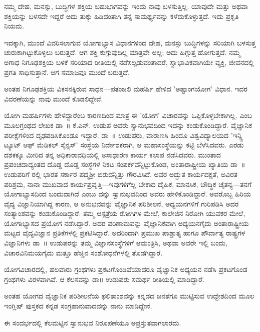 ನಮ್ಮ ದೇಹ, ಮನಸ್ಸು, ಬುದ್ಧಿಗಳ ಶಕ್ತಿಯ ಬಹುಭಾಗವನ್ನು ಇಂದು ನಾವು ಬಳಸುತ್ತಿಲ್ಲ. ಯಾವುದೇ ಮತ್ತು ಅಥವಾ ಶಕ್ತಿಯನ್ನು ಬಳಸದೇ ಇದ್ದರೆ ಅದು ತುಕ್ಕು ಹಿಡಿದಂತಾಗಿ ತನ್ನ ಸಾಮರ್ಥ್ಯವನ್ನು ಕಳೆದುಕೊಳ್ಳುತ್ತದೆ. ಇದು ಪ್ರಕೃತಿ ನಿಯಮ.

ಇದಕ್ಕಾಗಿ, ಮುಂದೆ ವಿವರಿಸಲಾಗುವ ಯೋಗಾಭ್ಯಾಸ ವಿಧಾನಗಳಿಂದ ದೇಹ, ಮನಸ್ಸು ಬುದ್ಧಿಗಳನ್ನು ಸರಿಯಾಗಿ ಬಳಸುತ್ತ ಚುರುಕಾಗಿಟ್ಟುಕೊಳ್ಳಲು ಬರುತ್ತದೆ. ಆಗ ಶಕ್ತಿ ಕುಗ್ಗುವುದಿಲ್ಲ ಮಾತ್ರವೇ ಅಲ್ಲ; ಅದು ಹಿಗ್ಗುತ್ತ ಹೋಗುತ್ತದೆ. ನಮ್ಮ ಅಗಾಧ ನಿಗೂಢಶಕ್ತಿಯ ಬಳಕೆ ಸರಿಯಾದ ರೀತಿಯಲ್ಲಿ ನಡೆಸಲ್ಪಡುವಂತಾದರೆ, ಸ್ವಾಭಾವಿಕವಾಗಿಯೇ ವ್ಯಕ್ತಿ, ಜೀವನದಲ್ಲಿ ಪ್ರಗತಿ ಸಾಧಿಸುತ್ತಾನೆ. ಆಗ ಸಮಾಜವೂ ಮುಂದೆ ಬರುತ್ತದೆ.

ಅಂತಹ ನಿಗೂಢಶಕ್ತಿಯ ವಿಕಸನಕ್ಕಿರುವ ಸಾಧನ—ಪತಂಜಲಿ ಮಹರ್ಷಿ ಹೇಳಿದ 'ಅಷ್ಟಾಂಗಯೋಗ' ವಿಧಾನ. ಇದರ ವಿವರಣೆಯನ್ನು ನಾವು ಮುಂದೆ ಕೊಡಲಿದ್ದೇವೆ.

ಯೋಗಿ ಮಹರ್ಷಿಗಳು ಹೇಳಿದ್ದಾರೆಂಬ ಕಾರಣದಿಂದ ಮಾತ್ರ ಈ 'ಯೋಗ' ವಿಚಾರವನ್ನು ಒಪ್ಪಿಕೊಳ್ಳಬೇಕಾಗಿಲ್ಲ.  ಎಂಬ ಮೂಲಗ್ರಂಥದ ಲೇಖಕ ಡಾ~॥ ಕೆ.ಎನ್. ಉಡುಪ ಅವರು ಸ್ವಾನುಭವದಿಂದ ಇದನ್ನು ಕಂಡುಕೊಂಡಿದ್ದಾರೆ. ವೈಜ್ಞಾನಿಕ ಪರೀಕ್ಷೆಗಳಿಂದ ದೃಢಪಡಿಸಿಕೊಂಡೂ ಇದ್ದಾರೆ. ಡಾ~॥ ಉಡುಪರು, ವಾರಾಣಸಿ ಹಿಂದೂ ವಿಶ್ವವಿದ್ಯಾಲಯದ 'ಇನ್ಸ್ಟಿ ಟ್ಯೂಟ್ ಆಫ್ ಮೆಡಿಕಲ್ ಸೈನ್ಸಸ್​' ಸಂಸ್ಥೆಯ ನಿರ್ದೇಶಕರಾಗಿ, ಆ ಮಹಾಸಂಸ್ಥೆಯನ್ನು ಕಟ್ಟಿ ಬೆಳೆಸಿದವರು. ಎರಡು ದಶಕಕ್ಕೂ ಮೀರಿದ ತನ್ನ ಅಧಿಕಾರಾವಧಿಯಲ್ಲಿ ಅಸಾಧಾರಣ ಕಾರ್ಯ ಕಲಾಪ ನಡೆಸಿದವರು.  ಮುಂತಾದ ಪ್ರಪಂಚದಾದ್ಯಂತದ ದೊಡ್ಡ ದೊಡ್ಡ ಸಂಸ್ಥೆಗಳ ನಿಕಟ ಸಂಪರ್ಕವನ್ನಿಟ್ಟುಕೊಂಡ, ಅಂತಾರಾಷ್ಟ್ರೀಯ ಖ್ಯಾತಿಯ ಡಾ~॥ ಉಡುಪರಿಗೆ  ರಲ್ಲಿ ಭಾರತ ಸರ್ಕಾರ ಪದ್ಮಶ‍್ರೀ ಬಿರುದನ್ನಿತ್ತು ಗೌರವಿಸಿದೆ. ಅವರ ಅದ್ಭುತ ಕಾರ್ಯದಕ್ಷತೆ, ಅವಿರತ ಪರಿಶ್ರಮ, ನಾನಾ ಮುಖವಾದ ಕಾರ್ಯಪ್ರವೃತ್ತಿ—ಇವುಗಳಿಗೆಲ್ಲ ಬೇಕಾದ ದೈಹಿಕ, ಮಾನಸಿಕ, ಬೌದ್ಧಿಕ ಚೈತನ್ಯ—ತನಗೆ ಯೋಗಾಭ್ಯಾಸದಿಂದ ಬಂದುದಾಗಿದೆ ಎಂಬು ದನ್ನು ಸ್ವಾನುಭವದಿಂದ ಅವರು ಹೇಳಿಕೊಂಡಿದ್ದಾರೆ. ಅವರೊಬ್ಬ ಹಿರಿಯ ವೈದ್ಯ ವಿಜ್ಞಾನಿಯಾಗಿದ್ದ ಕಾರಣ, ಆ ಅನುಭವವನ್ನು ವೈಜ್ಞಾನಿಕ ಪರಿಶೀಲನೆ, ಅಧ್ಯಯನಗಳಿಗೆ ಗುರಿಪಡಿಸಿ ಅದರ ಸಂತ್ಯಾಂಶವನ್ನು ಕಂಡುಕೊಂಡಿದ್ದಾರೆ. ತಮ್ಮ ಆಸ್ಪತ್ರೆಯ ರೋಗಿಗಳ ಮೇಲೆ, ಕಾಲೇಜಿನ ನಿರೋಗಿ ಯುವಕರ ಮೇಲೆ, ಯೋಗಾಭ್ಯಾಸದ ಪ್ರಯೋಗ ನಡೆಸಿದ್ದಾರೆ. ಅದರ ಪರಿಣಾಮವನ್ನು ವೈಜ್ಞಾನಿಕವಾಗಿ ಅಧ್ಯಯನಗೈದು ಅಂತಾರಾಷ್ಟ್ರೀಯ ಮಟ್ಟದ ವೈದ್ಯವಿಜ್ಞಾನ ಪ್ರತಿಕೆಗಳಲ್ಲಿ ಪ್ರಕಟಿಸಿದ್ದಾರೆ. ಅದರಿಂದಾಗಿ ಪ್ರಮುಖ ಪಾಶ್ಚಾತ್ಯ ಹಾಗೂ ಪೌರ್ವಾತ್ಯ ರಾಷ್ಟ್ರಗಳ ವಿಜ್ಞಾನಿಗಳು ಡಾ~॥ ಉಡುಪರನ್ನು ತಮ್ಮ ವಿಜ್ಞಾನಸಂಸ್ಥೆಗಳಿಗೆ ಆಮಂತ್ರಿಸಿ, ಅಥವಾ ಅವರೇ ಇಲ್ಲಿ ಬಂದು, ವಿಚಾರವಿನಿಮಯಗೈದು ಮತ್ತೂ ಹೆಚ್ಚಿನ ಸಂಶೋಧನೆಗಳಲ್ಲಿ ತೊಡಗಿದ್ದಾರೆ.

ಯೋಗವಿಚಾರದಲ್ಲಿ, ಹಲವಾರು ಗ್ರಂಥಗಳು ಪ್ರಕಟಗೊಂಡಿವೆಯಾದರೂ ವೈಜ್ಞಾನಿಕ ಅಧ್ಯಯನ ನಡೆಸಿ ಪ್ರಕಟಗೊಂಡ ಗ್ರಂಥಗಳು ವಿರಳವಾಗಿವೆ. ಆ ಕೆಲಸವನ್ನು ಡಾ॥ ಉಡುಪರು ಸಮರ್ಥ ರೀತಿಯಲ್ಲಿ ಮಾಡಿದ್ದಾರೆ.

ಅಂತಹ ಯೋಗದ ವೈಜ್ಞಾನಿಕ ಪರಿಶೀಲನೆಯ ಫಲಿತಾಂಶವನ್ನು ಕನ್ನಡದ ಜನತೆಗೂ ಮುಟ್ಟಿಸುವ ಉದ್ದೇಶದಿಂದ ಮೂಲ ಇಂಗ್ಲಿಷ್ ಪುಸ್ತಕದ ಕನ್ನಡ ಸಂಗ್ರಹಾನುವಾದವನ್ನು ನಾನು ಮಾಡಿದ್ದೇನೆ.

ಈ ಸಂದರ್ಭದಲ್ಲಿ ಕೆಲಮಟ್ಟಿನ ಸ್ವಾನುಭವ ನಿರೂಪಣೆಯೂ ಅಪ್ರಸ್ತುತವಾಗಲಾರದು.

